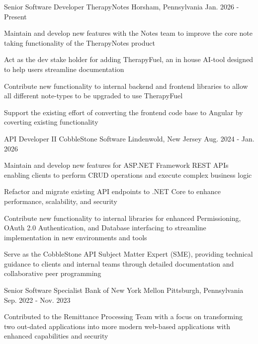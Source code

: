 \begin{cventries}
    \cventry
    {Senior Software Developer}
    {TherapyNotes}
    {Horsham, Pennsylvania}
    {Jan. 2026 - Present}
    {
      \begin{cvitems}
        \item {Maintain and develop new features with the Notes team to improve the core note taking functionality of the TherapyNotes product}
        \item {Act as the dev stake holder for adding TherapyFuel, an in house AI-tool designed to help users streamline documentation}
        \item {Contribute new functionality to internal backend and frontend libraries to allow all different note-types to be upgraded to use TherapyFuel}
        \item {Support the existing effort of converting the frontend code base to Angular by coverting existing functionality}
      \end{cvitems}
    }
    \cventry
    {API Developer II}
    {CobbleStone Software}
    {Lindenwold, New Jersey}
    {Aug. 2024 - Jan. 2026}
    {
      \begin{cvitems}
        \item {Maintain and develop new features for ASP.NET Framework REST APIs enabling clients to perform CRUD operations and execute complex business logic}
        \item {Refactor and migrate existing API endpoints to .NET Core to enhance performance, scalability, and security}
        \item {Contribute new functionality to internal libraries for enhanced Permissioning, OAuth 2.0 Authentication, and Database interfacing to streamline implementation in new environments and tools}
        \item {Serve as the CobbleStone API Subject Matter Expert (SME), providing technical guidance to clients and internal teams through detailed documentation and collaborative peer programming}
      \end{cvitems}
    }
  \cventry
    {Senior Software Specialist}
    {Bank of New York Mellon}
    {Pittsburgh, Pennsylvania}
    {Sep. 2022 - Nov. 2023}
    {
      \begin{cvitems}
        \item {Contributed to the Remittance Processing Team with a focus on transforming two out-dated applications into more modern web-based applications with enhanced capabilities and security}

\end{cvitems}}
\end{cventries}
